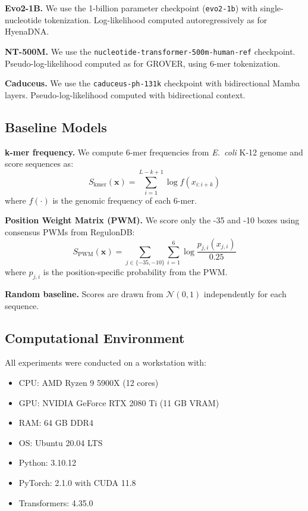 \documentclass{article}
\begin{document}
\textbf{Evo2-1B.} We use the 1-billion parameter checkpoint (\texttt{evo2-1b}) with single-nucleotide tokenization. Log-likelihood computed autoregressively as for HyenaDNA.

\textbf{NT-500M.} We use the \texttt{nucleotide-transformer-500m-human-ref} checkpoint. Pseudo-log-likelihood computed as for GROVER, using 6-mer tokenization.

\textbf{Caduceus.} We use the \texttt{caduceus-ph-131k} checkpoint with bidirectional Mamba layers. Pseudo-log-likelihood computed with bidirectional context.

\subsection{Baseline Models}

\textbf{k-mer frequency.} We compute 6-mer frequencies from \textit{E.\ coli} K-12 genome and score sequences as:
\begin{equation}
S_{\text{kmer}}(\mathbf{x}) = \sum_{i=1}^{L-k+1} \log f(x_{i:i+k})
\end{equation}
where $f(\cdot)$ is the genomic frequency of each 6-mer.

\textbf{Position Weight Matrix (PWM).} We score only the -35 and -10 boxes using consensus PWMs from RegulonDB:
\begin{equation}
S_{\text{PWM}}(\mathbf{x}) = \sum_{j \in \{-35, -10\}} \sum_{i=1}^{6} \log \frac{p_{j,i}(x_{j,i})}{0.25}
\end{equation}
where $p_{j,i}$ is the position-specific probability from the PWM.

\textbf{Random baseline.} Scores are drawn from $\mathcal{N}(0, 1)$ independently for each sequence.

\subsection{Computational Environment}

All experiments were conducted on a workstation with:
\begin{itemize}
\item CPU: AMD Ryzen 9 5900X (12 cores)
\item GPU: NVIDIA GeForce RTX 2080 Ti (11 GB VRAM)
\item RAM: 64 GB DDR4
\item OS: Ubuntu 20.04 LTS
\item Python: 3.10.12
\item PyTorch: 2.1.0 with CUDA 11.8
\item Transformers: 4.35.0
\end{itemize}
\end{document}
